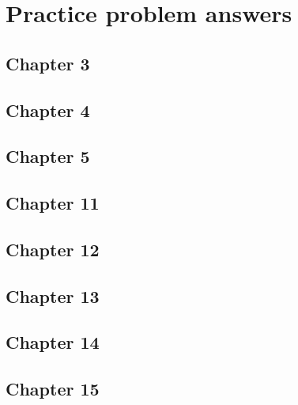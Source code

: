 \documentclass[
]{krantz}
\begin{document}
\hypertarget{appendix-appendix}{%
\appendix {}}


\hypertarget{problem-answers}{%
\chapter{Practice problem answers}\label{problem-answers}}

\hypertarget{problem-answers-chapter-3}{%
\section{Chapter 3}\label{problem-answers-chapter-3}}

\hypertarget{problem-answers-chapter-4}{%
\section{Chapter 4}\label{problem-answers-chapter-4}}

\hypertarget{problem-answers-chapter-5}{%
\section{Chapter 5}\label{problem-answers-chapter-5}}

\hypertarget{problem-answers-chapter-11}{%
\section{Chapter 11}\label{problem-answers-chapter-11}}

\hypertarget{problem-answers-chapter-12}{%
\section{Chapter 12}\label{problem-answers-chapter-12}}

\hypertarget{problem-answers-chapter-13}{%
\section{Chapter 13}\label{problem-answers-chapter-13}}

\hypertarget{problem-answers-chapter-14}{%
\section{Chapter 14}\label{problem-answers-chapter-14}}

\hypertarget{problem-answers-chapter-15}{%
\section{Chapter 15}\label{problem-answers-chapter-15}}
\end{document}
